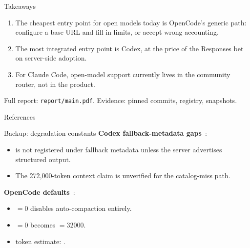 \documentclass[aspectratio=169,11pt]{beamer}
\begin{document}
\begin{frame}{Takeaways}
  \begin{enumerate}
    \item The cheapest entry point for open models today is
    \textcolor{genericcol}{OpenCode's} generic path: configure a base URL
    and fill in limits, or accept wrong accounting.
    \item The most integrated entry point is \textcolor{nativecol}{Codex},
    at the price of the Responses bet on server-side adoption.
    \item For \textcolor{unattcol}{Claude Code}, open-model support
    currently lives in the community router, not in the product.
  \end{enumerate}

  \vspace{0.6em}
  Full report: \texttt{report/main.pdf}. Evidence: pinned commits,
  registry, snapshots.
\end{frame}

\begin{frame}[allowframebreaks]{References}
  \footnotesize
  
  
\end{frame}

\appendix

\begin{frame}{Backup: degradation constants}
  \textbf{Codex fallback-metadata gaps}~\citep{codexRepo}:
  \begin{itemize}
    \item {} is not registered under fallback metadata
    unless the server advertises structured output.
    \item The 272,000-token context claim is unverified for the
    catalog-miss path.
  \end{itemize}
  \textbf{OpenCode defaults}~\citep{opencodeRepo}:
  \begin{itemize}
    \item {} $=0$ disables auto-compaction entirely.
    \item {} $=0$ becomes $=32000$.
    \item token estimate: .
  \end{itemize}
\end{frame}
\end{document}
